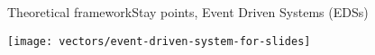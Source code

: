 \begin{frame}{Theoretical framework}{Stay points, Event Driven Systems (EDSs)}
{
    \centering
    \texttt{[image: vectors/event-driven-system-for-slides]}
    \par
}


  

  

\end{frame}

